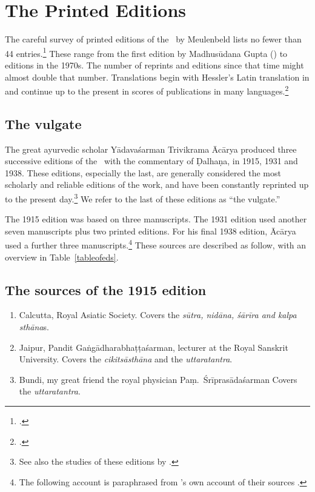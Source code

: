 \section{The Printed Editions}

The careful survey of printed editions of the \SS\ by Meulenbeld lists no fewer than 
44 entries.\footcite[IIB, 311--314]{meul-hist}  These range from the first edition 
by 
Madhusūdana Gupta (\citeyear{gupt-1835}) to editions in the 1970s. The 
number of 
reprints and editions since that time might almost double that number.  
Translations begin with Hessler's Latin translation in \citeyear{hess-1855} and 
continue up to the present in scores of publications in many 
languages.\footcites[E.g.,]{zysk-1984}[IIB, 314--315]{meul-hist}

\subsection{The vulgate}


The great ayurvedic scholar Yādavaśarman Trivikrama Ācārya produced three
successive editions of the \SS\ with the commentary of Ḍalhaṇa, in 1915, 1931 and
1938.  These editions, especially the last, are generally considered the most
scholarly and reliable editions of the work, and have been constantly reprinted up
to the present day.\footnote{See also the studies of these editions by
    \textcites[\S 1.2]{kleb-2021b}[143--144]{wuja-2013}.}  We refer to the last of
    these editions as “the vulgate.”

The 1915 edition was based on three manuscripts.  The 1931 edition used another
seven manuscripts plus two printed editions.  For his final 1938 edition, Ācārya
used a further three manuscripts.\footnote{The following account is
paraphrased from \citeauthor{vulgate}'s own account of their sources
\citep[22]{vulgate}.}  These sources are described as follow, with an overview in
Table~\ref{tableofeds}.

\subsection{The sources of the 1915 edition}

\begin{enumerate}
    \item[1] Calcutta, Royal Asiatic Society.  Covers the \emph{sūtra, nidāna, śārīra 
        and 
        kalpa sthāna}s.  
    
    \item [2] Jaipur, Pandit Gaṅgādharabhaṭṭaśarman, lecturer at the Royal 
    Sanskrit University.  Covers the \emph{cikitsāsthāna} and the 
    \emph{uttaratantra}.
    
    \item [3]  Bundi, my great friend the royal physician Paṃ.\ Śrīprasādaśarman  
    Covers the \emph{uttaratantra}.
\end{enumerate}

